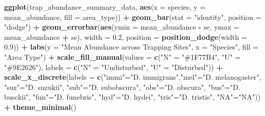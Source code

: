 \documentclass[
]{article}
\newenvironment{Shaded}{\begin{snugshade}}{\end{snugshade}}
\newcommand{\AttributeTok}[1]{\textcolor[rgb]{0.13,0.29,0.53}{#1}}
\newcommand{\FloatTok}[1]{\textcolor[rgb]{0.00,0.00,0.81}{#1}}
\newcommand{\FunctionTok}[1]{\textcolor[rgb]{0.13,0.29,0.53}{\textbf{#1}}}
\newcommand{\NormalTok}[1]{#1}
\newcommand{\OtherTok}[1]{\textcolor[rgb]{0.56,0.35,0.01}{#1}}
\newcommand{\SpecialCharTok}[1]{\textcolor[rgb]{0.81,0.36,0.00}{\textbf{#1}}}
\newcommand{\StringTok}[1]{\textcolor[rgb]{0.31,0.60,0.02}{#1}}
\begin{document}
\begin{Shaded}
\begin{Highlighting}[]
  \FunctionTok{ggplot}\NormalTok{(trap\_abundance\_summary\_data, }\FunctionTok{aes}\NormalTok{(}\AttributeTok{x =}\NormalTok{ species, }\AttributeTok{y =}\NormalTok{ mean\_abundance, }\AttributeTok{fill =}\NormalTok{ area\_type)) }\SpecialCharTok{+}
    \FunctionTok{geom\_bar}\NormalTok{(}\AttributeTok{stat =} \StringTok{"identity"}\NormalTok{, }\AttributeTok{position =} \StringTok{"dodge"}\NormalTok{) }\SpecialCharTok{+}
    \FunctionTok{geom\_errorbar}\NormalTok{(}\FunctionTok{aes}\NormalTok{(}\AttributeTok{ymin =}\NormalTok{ mean\_abundance }\SpecialCharTok{{-}}\NormalTok{ se, }\AttributeTok{ymax =}\NormalTok{ mean\_abundance }\SpecialCharTok{+}\NormalTok{ se), }\AttributeTok{width =} \FloatTok{0.2}\NormalTok{, }\AttributeTok{position =} \FunctionTok{position\_dodge}\NormalTok{(}\AttributeTok{width =} \FloatTok{0.9}\NormalTok{)) }\SpecialCharTok{+}
    \FunctionTok{labs}\NormalTok{(}\AttributeTok{y =} \StringTok{"Mean Abundance across Trapping Sites"}\NormalTok{,}
         \AttributeTok{x =} \StringTok{"Species"}\NormalTok{,}
         \AttributeTok{fill =} \StringTok{"Area Type"}\NormalTok{) }\SpecialCharTok{+}
    \FunctionTok{scale\_fill\_manual}\NormalTok{(}\AttributeTok{values =} \FunctionTok{c}\NormalTok{(}\StringTok{"N"} \OtherTok{=} \StringTok{"\#1F77B4"}\NormalTok{, }\StringTok{"U"} \OtherTok{=} \StringTok{"\#9E2626"}\NormalTok{), }\AttributeTok{labels =} \FunctionTok{c}\NormalTok{(}\StringTok{"N"} \OtherTok{=} \StringTok{"Undisturbed"}\NormalTok{, }\StringTok{"U"} \OtherTok{=} \StringTok{"Disturbed"}\NormalTok{)) }\SpecialCharTok{+}
    \FunctionTok{scale\_x\_discrete}\NormalTok{(}\AttributeTok{labels =} \FunctionTok{c}\NormalTok{(}\StringTok{"immi"}\OtherTok{=}\StringTok{"D. immigrans"}\NormalTok{,}\StringTok{"mel"}\OtherTok{=}\StringTok{"D. melanogaster"}\NormalTok{, }\StringTok{"suz"}\OtherTok{=}\StringTok{"D. suzukii"}\NormalTok{, }\StringTok{"sub"}\OtherTok{=}\StringTok{"D. subobscura"}\NormalTok{, }\StringTok{"obs"}\OtherTok{=}\StringTok{"D. obscura"}\NormalTok{, }\StringTok{"bus"}\OtherTok{=}\StringTok{"D. busckii"}\NormalTok{, }\StringTok{"fun"}\OtherTok{=}\StringTok{"D. funebris"}\NormalTok{, }\StringTok{"hyd"}\OtherTok{=}\StringTok{"D. hydei"}\NormalTok{, }\StringTok{"tris"}\OtherTok{=}\StringTok{"D. tristis"}\NormalTok{, }\StringTok{"NA"}\OtherTok{=}\StringTok{"NA"}\NormalTok{)) }\SpecialCharTok{+}
    \FunctionTok{theme\_minimal}\NormalTok{()}
\end{Highlighting}
\end{Shaded}
\end{document}
